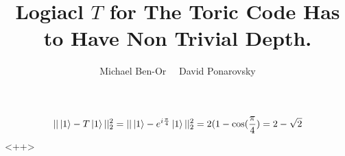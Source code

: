 \documentclass[manuscript,screen,review]{acmart}
\begin{document}

\title{ Logiacl $T$ for The Toric Code Has to Have Non Trivial Depth.}
\author{Michael Ben-Or \ \ David Ponarovsky}
\maketitle

\newcommand*{\Mbas}{\mathcal{X}^\prime}
\newcommand*{\bas}{\mathcal{X}}
\newcommand*{\sMbas}{\Mbas}
\newcommand*{\QQ}{C_{X}/C_{Z}^\perp }
\newcommand*{\trig}{ Triorthogonal }
\newcommand*{\Hyp}{ Hyperproduct }
\newcommand*{\Cin}{ C_{\text{initial}} }
\newcommand*{\Ctan}{ C_{\text{Tan}} }



\newcommand*{\QACze}{ \mathbf{QAC}_{0} }
\newcommand*{\QNCzef}{ \mathbf{QNC}_{0,f} }
\newcommand*{\QNCze}{ \mathbf{QNC}_{0} }
\newcommand*{\QNCon}{ \mathbf{QNC}_{1} }
\newcommand*{\NCon}{ \mathbf{NC}_{1} }
\newcommand*{\noiseQNCon}{ noisy-$\QNCon$ }




\begin{equation*}
  \begin{split}
    || \ket{1} -  T\ket{1} ||_{2}^{2} = || \ket{1} -  e^{i\frac{\pi}{4}}\ket{1} ||_{2}^{2} = 2(1 - \cos(\frac{\pi}{4}) = 2 - \sqrt{2}
  \end{split}
\end{equation*}<++>



\printbibliography
\end{document}
